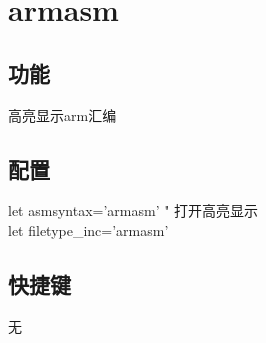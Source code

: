 \chapter{armasm}

\section{功能}
高亮显示arm汇编

\section{配置}
let asmsyntax='armasm' " 打开高亮显示 \\
let filetype\_inc='armasm'

\section{快捷键}
无

\newpage
